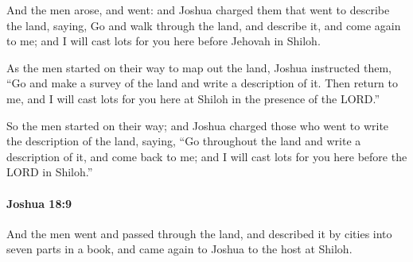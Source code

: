 			\begin{versebox}
					\item[BHS] 
					\item[ASV] And the men arose, and went: and Joshua charged them that went to describe the land, saying, Go and walk through the land, and describe it, and come again to me; and I will cast lots for you here before Jehovah in Shiloh.
					\item[NIV] As the men started on their way to map out the land, Joshua instructed them, “Go and make a survey of the land and write a description of it. Then return to me, and I will cast lots for you here at Shiloh in the presence of the LORD.”
					\item[NRSV] So the men started on their way; and Joshua charged those who went to write the description of the land, saying, “Go throughout the land and write a description of it, and come back to me; and I will cast lots for you here before the LORD in Shiloh.”
			\end{versebox}

		\paragraph{Joshua 18:9} %
			\label{JOSHUA-18-9}

			And the men went and passed through the land, and described it by cities into seven parts in a book, and came again to Joshua to the host at Shiloh.

